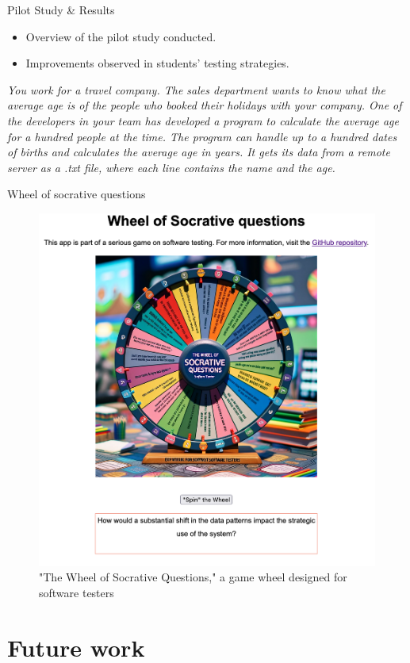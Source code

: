 \documentclass[aspectratio=169]{beamer}
\begin{document}
\begin{frame}{Pilot Study \& Results}
    \begin{itemize}
        \item Overview of the pilot study conducted.
        \item Improvements observed in students' testing strategies.
    \end{itemize}
    \textit{You work for a travel company. 
The sales department wants to know what the average age is of the people who booked their holidays with your company. One of the developers in your team has developed a program to calculate the average age for a hundred people at the time. The program can handle up to a hundred dates of births and calculates the average age in years. It gets its data from a remote server as a .txt file, where each line contains the name and the age.
}
\end{frame}

\begin{frame}{Wheel of socrative questions}
\begin{figure}
    \centering
    \includegraphics[width=0.5\linewidth]{presentation//images//wheel}
    \caption{"The Wheel of Socrative Questions," a game wheel designed for software testers}
\end{figure}
\end{frame}


\section{Future work}
\end{document}
